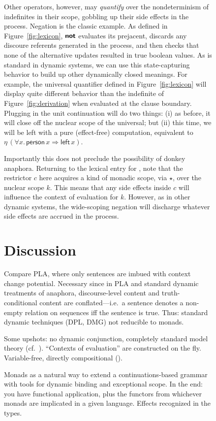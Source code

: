 \begin{figure*}
  Other operators, however, may \emph{quantify} over the nondeterminism of indefinites in their scope, gobbling up their side effects in the process. Negation is the classic example. As defined in Figure~\ref{fig:lexicon}, $\textbf{\textsf{not}}$ evaluates its prejacent, discards any discoure referents generated in the process, and then checks that none of the alternative updates resulted in true boolean values. As is standard in dynamic systems, we can use this state-capturing behavior to build up other dynamically closed meanings. For example, the universal quantifier defined in Figure~\ref{fig:lexicon} will display quite different behavior than the indefinite of Figure~\ref{fig:derivation} when evaluated at the clause boundary. Plugging in the unit continuation will do two things: (i) as before, it will close off the nuclear scope of the universal; but (ii) this time, we will be left with a pure (effect-free) computation, equivalent to $\eta\,(\forall x.\,\textsf{person}\,x \Rightarrow \textsf{left}\,x)$.

  Importantly this does not preclude the possibility of donkey anaphora. Returning to the lexical entry for , note that the restrictor $c$ here acquires a kind of monadic scope, via $\star$, over the nuclear scope $k$. This means that any side effects inside $c$ will influence the context of evaluation for $k$. However, as in other dynamic systems, the wide-scoping negation will discharge whatever side effects are accrued in the process. %

\section{Discussion}
	Compare PLA, where only sentences are imbued with context change potential. Necessary since in PLA and standard dynamic treatments of anaphora, discourse-level content and truth-conditional content are conflated---i.e.~a sentence denotes a non-empty relation on sequences iff the sentence is true. Thus: standard dynamic techniques (DPL, DMG) not reducible to monads. %
	
	Some upshots: no dynamic conjunction, completely standard model theory (cf.~\citealt{Groote:2006}). ``Contexts of evaluation'' are constructed on the fly. Variable-free, directly compositional (\citealt{Jacobson:1999}). %

	Monads as a natural way to extend a continuations-based grammar with tools for dynamic binding and exceptional scope. In the end: you have functional application, plus the functors from whichever monads are implicated in a given language. Effects recognized in the types. %


\end{figure*}
